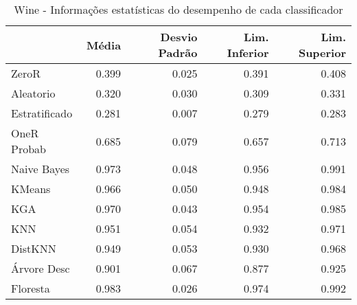 \begin{table}
\centering
\label{Wine_status_table}
\begin{tabular}{lrrrr}
\toprule
{} & Média & Desvio Padrão & Lim. Inferior & Lim. Superior \\
\midrule
ZeroR         & 0.399 &         0.025 &         0.391 &         0.408 \\
Aleatorio     & 0.320 &         0.030 &         0.309 &         0.331 \\
Estratificado & 0.281 &         0.007 &         0.279 &         0.283 \\
OneR Probab   & 0.685 &         0.079 &         0.657 &         0.713 \\
Naive Bayes   & 0.973 &         0.048 &         0.956 &         0.991 \\
KMeans        & 0.966 &         0.050 &         0.948 &         0.984 \\
KGA           & 0.970 &         0.043 &         0.954 &         0.985 \\
KNN           & 0.951 &         0.054 &         0.932 &         0.971 \\
DistKNN       & 0.949 &         0.053 &         0.930 &         0.968 \\
Árvore Desc   & 0.901 &         0.067 &         0.877 &         0.925 \\
Floresta      & 0.983 &         0.026 &         0.974 &         0.992 \\
\bottomrule
\end{tabular}
\caption{Wine - Informações estatísticas do desempenho de cada classificador}
\end{table}
